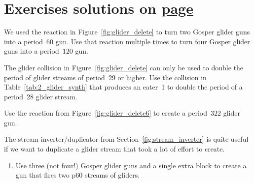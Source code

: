 \section*{Exercises \hfill \normalfont\textsf{\small solutions on \hyperlink{solutions_glider_guns}{page \pageref{solutions_glider_guns}}}}
\label{sec:guns_exercises}
\vspace*{-0.4cm}\hrulefill\vspace*{-0.3cm}\footnotesize\begin{multicols}{2}\vspace*{-0.4cm}\raggedcolumns{}
	\setlength{\parskip}{0pt}
	
	\begin{problem}\label{exer:gun_double_again}
		We used the reaction in Figure~\ref{fig:glider_delete} to turn two Gosper glider guns into a period~$60$ gun. Use that reaction multiple times to turn four Gosper glider guns into a period~$120$ gun.
	\end{problem}
	
	
	\mfilbreak
	
	
	\begin{problem}\label{exer:p28_double}
		The glider collision in Figure~\ref{fig:glider_delete} can only be used to double the period of glider streams of period~$29$ or higher. Use the collision in Table~\ref{tab:2_glider_synth} that produces an eater~1 to double the period of a period~28 glider stream.
	\end{problem}
	
	
	\mfilbreak
	
	
	\begin{problem}\label{exer:p322_gun}
		Use the reaction from Figure~\ref{fig:glider_delete6} to create a period~$322$ glider gun.
	\end{problem}
	
	
	\mfilbreak
	
	
	\begin{problem}\label{exer:duplicate_doubled_stream}
		The stream inverter/duplicator from Section~\ref{fig:stream_inverter} is quite useful if we want to duplicate a glider stream that took a lot of effort to create.\smallskip
		
		\begin{enumerate}[label=\bf\color{ocre}(\alph*)]
			\item Use three (not four!) Gosper glider guns and a single extra block to create a gun that fires two p$60$ streams of gliders.
			

\end{enumerate}
\end{problem}
\end{multicols}

